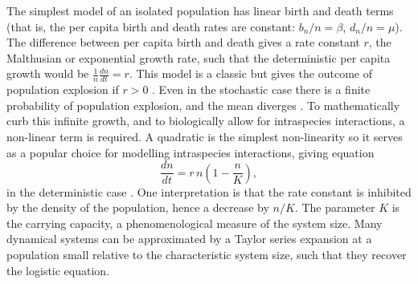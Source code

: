 The simplest model of an isolated population has linear birth and death terms (that is, the per capita birth and death rates are constant: $b_n/n=\beta$, $d_n/n=\mu$). 
The difference between per capita birth and death gives a rate constant $r$, the Malthusian or exponential growth rate, such that the deterministic per capita growth would be $\frac{1}{n}\frac{dn}{dt} = r$. %
This model is a classic but gives the outcome of population explosion if $r>0$ \cite{Malthus1798}. 
Even in the stochastic case there is a finite probability of population explosion, and the mean diverges \cite{Nisbet1982}. 
To mathematically curb this infinite growth, and to biologically allow for intraspecies interactions, a non-linear term is required. 
A quadratic is the simplest non-linearity so it serves as a popular choice for modelling intraspecies interactions, giving equation
\begin{equation}
\frac{dn}{dt} = r\,n\left(1-\frac{n}{K}\right),
\label{logistic}
\end{equation}
in the deterministic case \cite{Greenhalgh1990,Ovaskainen2010,Assaf2010,Allen2003a,Norden1982,Newman2004,Allen2005,Nasell2001}. %
One interpretation is that the rate constant is inhibited by the density of the population, hence a decrease by $n/K$. %
The parameter $K$ is the carrying capacity, a phenomenological measure of the system size. 
%
Many dynamical systems can be approximated by a Taylor series expansion at a population small relative to the characteristic system size, such that they recover the logistic equation. %
